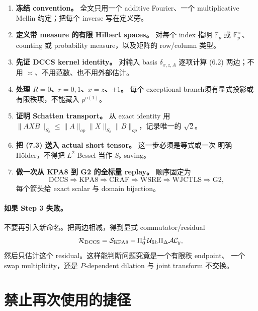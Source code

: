 \documentclass[11pt,a4paper]{ctexart}
\theoremstyle{definition}
\newcommand{\F}{\mathbb F}
\newcommand{\1}{\mathbf 1}
\begin{document}
\begin{enumerate}[label=\textbf{Step \arabic*.}]
\item \textbf{冻结 convention。} 全文只用一个 additive Fourier、一个
multiplicative Mellin 约定；把每个 inverse 写在定义旁。
\item \textbf{定义带 measure 的有限 Hilbert spaces。} 对每个 index 指明
$\F_p$ 或 $\F_p^\times$、counting 或 probability measure，以及矩阵的 row/column 类型。
\item \textbf{先证 DCCS kernel identity。} 对输入 basis
$\delta_{x,z,A}$ 逐项计算 (6.2) 两边；不用 $\asymp$、不用范数、也不用外部估计。
\item \textbf{处理 $R=0$、$r=0,1$、$x=z$、$\pm1$。} 每个 exceptional
branch须有显式投影或有限秩项，不能藏入 $p^{o(1)}$。
\item \textbf{证明 Schatten transport。} 从 exact identity 用
$\|AXB\|_{S_8}\le\|A\|_{op}\|X\|_{S_8}\|B\|_{op}$，记录唯一的 $\sqrt2$。
\item \textbf{把 (7.3) 送入 actual short tensor。} 这一步必须是等式或一次
明确 Hölder，不得把 $L^2$ Bessel 当作 $S_8$ saving。
\item \textbf{做一次从 KPA8 到 G2 的全标量 replay。} 顺序固定为
\[
\mathrm{DCCS}\Rightarrow\mathrm{KPA8}\Rightarrow\mathrm{CRAF}
\Rightarrow\mathrm{WSRE}\Rightarrow\mathrm{WJCTLS}\Rightarrow\mathrm{G2},
\]
每个箭头给 exact scalar 与 domain bijection。
\end{enumerate}

\paragraph{如果 Step 3 失败。}
不要再引入新命名。把两边相减，得到显式 commutator/residual
\[
\mathcal R_{\rm DCCS}
=\mathcal S_{\rm KPA8}
-\Pi_0^\perp\mathcal U_{\rm fib}\Pi_\Delta\mathcal A\mathcal C_y,
\]
然后只估计这个 residual。这样能判断问题究竟是一个有限秩 endpoint、
一个 swap multiplicity，还是 $P$-dependent dilation 与 joint transform 不交换。

\section{禁止再次使用的捷径}
\end{document}
